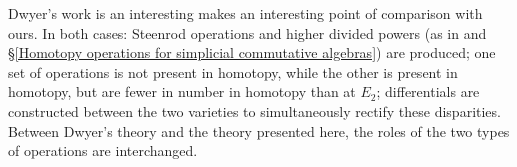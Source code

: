 \documentclass[11pt]{amsart} \renewcommand{\baselinestretch}{1.4}
\theoremstyle{plain}
\theoremstyle{definition}
\renewcommand{\to}{\longrightarrow}
\newcommand{\Sq}{\mathrm{Sq}}
\begin{document}
\begin{second quadrant homotopy sseq operations}
Dwyer's work is an interesting makes an interesting point of comparison with ours. In both cases: Steenrod operations and higher divided powers (as in \cite{DwyerHigherDividedSquares.pdf} and \S\ref{Homotopy operations for simplicial commutative algebras}) are produced; one set of operations is not present in homotopy, while the other is present in homotopy, but are fewer in number in homotopy than at $E_2$; differentials are constructed between the two varieties to simultaneously rectify these disparities. Between Dwyer's theory and the theory presented here, the roles of the two types of operations are interchanged.


\end{second quadrant homotopy sseq operations}
\end{document}
